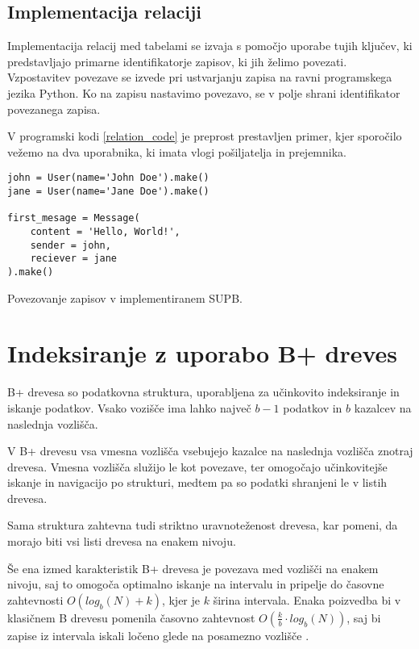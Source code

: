 \documentclass[a4paper,12pt,openright]{book}
\begin{document}
        \subsection{Implementacija relaciji}

        Implementacija relacij med tabelami se izvaja s pomočjo uporabe tujih ključev, ki predstavljajo primarne identifikatorje zapisov, ki jih želimo povezati. Vzpostavitev povezave se izvede pri ustvarjanju zapisa na ravni programskega jezika Python. Ko na zapisu nastavimo povezavo, se v polje shrani identifikator povezanega zapisa.

        V programski kodi \ref{relation_code} je preprost prestavljen primer, kjer sporočilo vežemo na dva uporabnika, ki imata vlogi pošiljatelja in prejemnika.

\begin{code}
\begin{verbatim}
john = User(name='John Doe').make()
jane = User(name='Jane Doe').make()

first_mesage = Message(
    content = 'Hello, World!',
    sender = john,
    reciever = jane
).make()
\end{verbatim}
\caption{Povezovanje zapisov v implementiranem SUPB.}
\label{relation_code}
\end{code}

    \section{Indeksiranje z uporabo B+ dreves}

        B+ drevesa so podatkovna struktura, uporabljena za učinkovito indeksiranje in iskanje podatkov. Vsako vozišče ima lahko največ $b - 1$ podatkov in $b$ kazalcev na naslednja vozlišča.

        V B+ drevesu vsa vmesna vozlišča vsebujejo kazalce na naslednja vozlišča znotraj drevesa. Vmesna vozlišča služijo le kot povezave, ter omogočajo učinkovitejše iskanje in navigacijo po strukturi, medtem pa so podatki shranjeni le v listih drevesa.

        Sama struktura zahtevna tudi striktno uravnoteženost drevesa, kar pomeni, da morajo biti vsi listi drevesa na enakem nivoju.

        Še ena izmed karakteristik B+ drevesa je povezava med vozlišči na enakem nivoju, saj to omogoča optimalno iskanje na intervalu in pripelje do časovne zahtevnosti $O(log_b(N) + k)$, kjer je $k$ širina intervala. Enaka poizvedba bi v klasičnem B drevesu pomenila časovno zahtevnost $O(\frac{k}{b} \cdot log_b(N))$, saj bi zapise iz intervala iskali ločeno glede na posamezno vozlišče \cite{BPTREE}.
\end{document}
